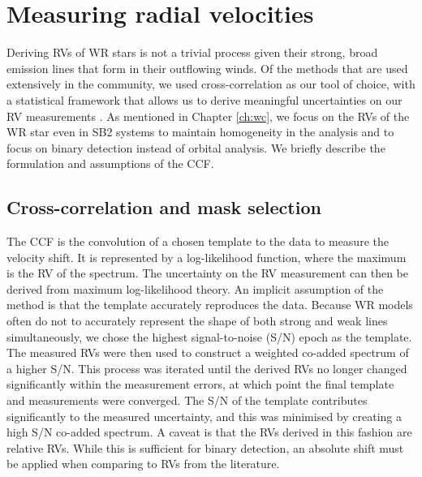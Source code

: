 \section{Measuring radial velocities}\label{sect:RVdet_WNE}
Deriving RVs of WR stars is not a trivial process given their strong, broad emission lines that form in their outflowing winds. Of the methods that are used extensively in the community, we used cross-correlation as our tool of choice, with a statistical framework that allows us to derive meaningful uncertainties on our RV measurements \citep[][see Chapter \ref{ch:wc} for more details]{2003Zucker}. As mentioned in Chapter \ref{ch:wc}, we focus on the RVs of the WR star even in SB2 systems to maintain homogeneity in the analysis and to focus on binary detection instead of orbital analysis. We briefly describe the formulation and assumptions of the CCF.

\subsection{Cross-correlation and mask selection}
The CCF is the convolution of a chosen template to the data to measure the velocity shift. It is represented by a log-likelihood function, where the maximum is the RV of the spectrum. The uncertainty on the RV measurement can then be derived from maximum log-likelihood theory. An implicit assumption of the method is that the template accurately reproduces the data. Because WR models often do not to accurately represent the shape of both strong and weak lines simultaneously, we chose the highest signal-to-noise (S/N) epoch as the template. The measured RVs were then used to construct a weighted co-added spectrum of a higher S/N. This process was iterated until the derived RVs no longer changed significantly within the measurement errors, at which point the final template and measurements were converged. The S/N of the template contributes significantly to the measured uncertainty, and this was minimised by creating a high S/N co-added spectrum. A caveat is that the RVs derived in this fashion are relative RVs. While this is sufficient for binary detection, an absolute shift must be applied when comparing to RVs from the literature.

